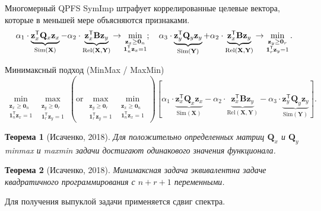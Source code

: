 \documentclass[9pt]{beamer}
\newcommand{\bz}{\mathbf{z}}
\newcommand{\bY}{\mathbf{Y}}
\newcommand{\bX}{\mathbf{X}}
\newcommand{\bB}{\mathbf{B}}
\newcommand{\bQ}{\mathbf{Q}}
\newcommand{\bOne}{\boldsymbol{1}}
\newcommand{\bZero}{\boldsymbol{0}}
\newcommand{\T}{\mathsf{T}}
\newtheorem{rustheorem}{Теорема}
\begin{document}
\begin{frame}{Многомерный QPFS}
	SymImp штрафует коррелированные целевые вектора, которые в меньшей мере объясняются признаками. 
	\[
	\alpha_1 \cdot \underbrace{\bz_x^{\T} \bQ_x \bz_x}_{\text{Sim}(\bX)} - \alpha_2 \cdot \underbrace{\vphantom{()} \bz_x^{\T}\mathbf{B} \bz_y}_{\text{Rel}(\bX, \bY)} \rightarrow \min_{\substack{\bz_x \geq \bZero_n \\ \bOne_n^{\T}\bz_x=1}}; \quad
	\alpha_3 \cdot \underbrace{\bz_y^{\T} \bQ_y \bz_y}_{\text{Sim}(\bY)} + \alpha_2 \cdot \underbrace{\vphantom{()} \bz_x^{\T} \mathbf{B} \bz_y}_{\text{Rel}(\bX, \bY)} \rightarrow \min_{\substack{\bz_y \geq \bZero_r  \\ \bOne_r^{\T}\bz_y=1}}.
	\]
	\vspace{-0.2cm}
	\begin{block}{Минимаксный подход (MinMax / MaxMin)}
	\vspace{-0.5cm}
	\[
	\min_{\substack{\bz_x \geq \bZero_n \\ \bOne_n^{\T}\bz_x=1}} 	\max_{\substack{\bz_y \geq \bZero_r \\ \bOne_r^{\T}\bz_y=1}} \left(\text {or} \, \max_{\substack{\bz_y \geq \bZero_r \\ \bOne_r^{\T}\bz_y=1}} \min_{\substack{\bz_x \geq \bZero_n \\ \bOne_n^{\T}\bz_x=1}}\right) \left[\alpha_1 \cdot \underbrace{\bz_x^{\T} \bQ_x \bz_x}_{\text{Sim}(\bX)} - \alpha_2 \cdot \underbrace{\bz_x^{\T} \bB \bz_y}_{\text{Rel}(\bX, \bY)} - \alpha_3 \cdot \underbrace{\bz_y^{\T} \bQ_y \bz_y}_{\text{Sim}(\bY)}\right].
	\]
	\end{block}
	\vspace{-0.4cm}
	\begin{rustheorem}[Исаченко, 2018]
		Для положительно определенных матриц $\bQ_x$ и $\bQ_y$ minmax и maxmin задачи достигают одинакового значения функционала.
	\end{rustheorem}
	\vspace{-0.2cm}
	\begin{rustheorem}[Исаченко, 2018]
		Минимаксная задача эквивалентна задаче квадратичного программирования с $n + r + 1$ переменными.
	\end{rustheorem}
	Для получения выпуклой задачи применяется сдвиг спектра.

\end{frame}
\end{document}
